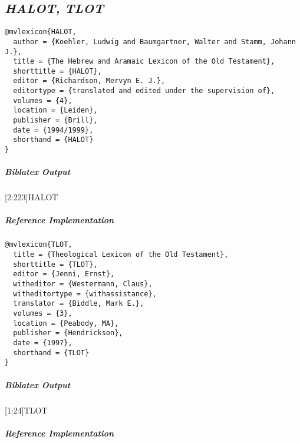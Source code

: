 \documentclass[a4paper]{article}
\newenvironment{biboutput}{%
  \subparagraph{Biblatex Output}
}{\color{black}}
\newenvironment{refimp}{%
  \subparagraph{Reference Implementation}
  \color{reference-colour}
  \rm
}{\par\color{black}}
\begin{document}
\subsection{\emph{HALOT,} \emph{TLOT}}

\begin{lstlisting}
@mvlexicon{HALOT,
  author = {Koehler, Ludwig and Baumgartner, Walter and Stamm, Johann J.},
  title = {The Hebrew and Aramaic Lexicon of the Old Testament},
  shorttitle = {HALOT},
  editor = {Richardson, Mervyn E. J.},
  editortype = {translated and edited under the supervision of},
  volumes = {4},
  location = {Leiden},
  publisher = {Brill},
  date = {1994/1999},
  shorthand = {HALOT}
}
\end{lstlisting}

\begin{biboutput}
  [2:223]{HALOT}
\end{biboutput}

\begin{refimp}
\end{refimp}

\medskip

\begin{lstlisting}
@mvlexicon{TLOT,
  title = {Theological Lexicon of the Old Testament},
  shorttitle = {TLOT},
  editor = {Jenni, Ernst},
  witheditor = {Westermann, Claus},
  witheditortype = {withassistance},
  translator = {Biddle, Mark E.},
  volumes = {3},
  location = {Peabody, MA},
  publisher = {Hendrickson},
  date = {1997},
  shorthand = {TLOT}
}
\end{lstlisting}

\begin{biboutput}
  [1:24]{TLOT}
\end{biboutput}

\begin{refimp}
\end{refimp}

\clearpage


\clearpage

\printbibliography
\end{document}
